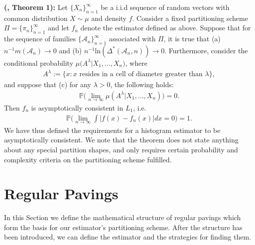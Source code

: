 \documentclass{report}
\begin{document}
\noindent\textbf{(\cite{Consistency}, Theorem 1):} Let $\{X_n\}_{n=1}^\infty$ be a i.i.d sequence of random vectors with common distribution $X \sim \mu$ and density $f$. Consider a fixed partitioning scheme
$\Pi = \{\pi_n\}_{n=1}^\infty$ and let $f_n$ denote the estimator defined as above.
Suppose that for the sequence of families $\{\mathcal{A}_n\}_{n=1}^\infty$ associated with $\Pi$, it is true that (a) $n^{-1}m(\mathcal{A}_n) \rightarrow 0$ and 
(b) $n^{-1}\text{ln}(\Delta^*(\mathcal{A}_n, n)) \rightarrow 0$. 
Furthermore, consider the conditional probability $\mu\big(A^\lambda| X_1,\dots,X_n \big)$, where 
\begin{align*}
	A^\lambda := \{x : x \text{ resides in a cell of diameter greater than }\lambda \},
\end{align*}
and suppose that (c) for any $\lambda > 0$, the following holds:
\begin{align*}
	\mathbb{P}\big(\lim_{n \rightarrow \infty} \mu(A^\lambda | X_1,\dots,X_n)  \big) = 0.
\end{align*}
Then $f_n$ is asymptotically consistent in $L_1$, i.e.  
\begin{align*}
	\mathbb{P}\big( \lim_{n \rightarrow \infty} \int \big| f(x) - f_n(x) \big|dx = 0 \big) = 1.
\end{align*}
\newline\noindent We have thus defined the requirements for a histogram estimator to be asymptotically consistent. We note that the theorem does not state anything about any special partition shapes, 
and only requires certain probability and complexity criteria on the partitioning scheme fulfilled.

\chapter{Regular Pavings}
In this Section we define the mathematical structure of regular pavings which form the basis for our estimator's partitioning scheme. After the structure has been introduced, we can define the estimator and the strategies for finding them.
\end{document}
